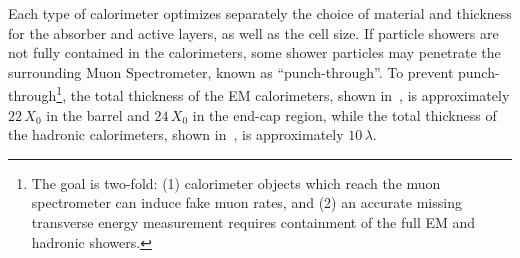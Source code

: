 Each type of calorimeter optimizes separately the choice of material and thickness for the absorber and active layers, as well as the cell size. If particle showers are not fully contained in the calorimeters, some shower particles may penetrate the surrounding Muon Spectrometer, known as ``punch-through''. To prevent punch-through\footnote{
	The goal is two-fold: (1) calorimeter objects which reach the muon spectrometer can induce fake muon rates, and (2) an accurate missing transverse energy measurement requires containment of the full EM and hadronic showers.
}, the total thickness of the EM calorimeters, shown in~\Fig{\ref{fig:x0_cal}}, is approximately $22\,X_0$ in the barrel and $24\,X_0$ in the end-cap region, while the total thickness of the hadronic calorimeters, shown in~\Fig{\ref{fig:lambda_cal}}, is approximately $10\,\lambda$. 

